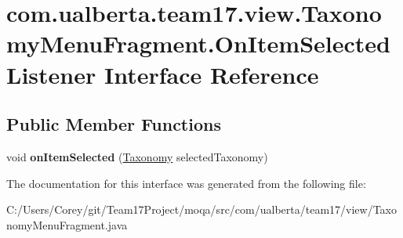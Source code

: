 \hypertarget{interfacecom_1_1ualberta_1_1team17_1_1view_1_1_taxonomy_menu_fragment_1_1_on_item_selected_listener}{\section{com.\+ualberta.\+team17.\+view.\+Taxonomy\+Menu\+Fragment.\+On\+Item\+Selected\+Listener Interface Reference}
\label{interfacecom_1_1ualberta_1_1team17_1_1view_1_1_taxonomy_menu_fragment_1_1_on_item_selected_listener}
}
\subsection*{Public Member Functions}
\begin{DoxyCompactItemize}
\item 
\hypertarget{interfacecom_1_1ualberta_1_1team17_1_1view_1_1_taxonomy_menu_fragment_1_1_on_item_selected_listener_a0b54db23dedb03a43f115d9ff17de976}{void {\bfseries on\+Item\+Selected} (\hyperlink{enumcom_1_1ualberta_1_1team17_1_1view_1_1_list_fragment_1_1_taxonomy}{Taxonomy} selected\+Taxonomy)}\label{interfacecom_1_1ualberta_1_1team17_1_1view_1_1_taxonomy_menu_fragment_1_1_on_item_selected_listener_a0b54db23dedb03a43f115d9ff17de976}

\end{DoxyCompactItemize}


The documentation for this interface was generated from the following file\+:\begin{DoxyCompactItemize}
\item 
C\+:/\+Users/\+Corey/git/\+Team17\+Project/moqa/src/com/ualberta/team17/view/Taxonomy\+Menu\+Fragment.\+java\end{DoxyCompactItemize}
